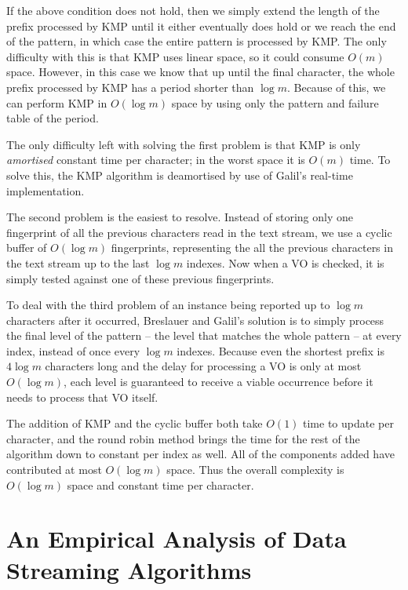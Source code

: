 \documentclass[ %
                    author={Dominic Joseph Moylett},
                    degree={MEng},
                     title={Dictionary Matching with Fingerprints},
                  subtitle={An Empirical Analysis},
                      type={research},
                      year={2015} ]{dissertation}
\begin{document}
If the above condition does not hold, then we simply extend the length of the prefix processed by KMP until it either eventually does hold or we reach the end of the pattern, in which case the entire pattern is processed by KMP. The only difficulty with this is that KMP uses linear space, so it could consume $O(m)$ space. However, in this case we know that up until the final character, the whole prefix processed by KMP has a period shorter than $\log m$. Because of this, we can perform KMP in $O(\log m)$ space by using only the pattern and failure table of the period.

The only difficulty left with solving the first problem is that KMP is only \textit{amortised} constant time per character; in the worst space it is $O(m)$ time. To solve this, the KMP algorithm is deamortised by use of Galil's \cite{Galil:1981:SMR:322234.322244} real-time implementation.

The second problem is the easiest to resolve. Instead of storing only one fingerprint of all the previous characters read in the text stream, we use a cyclic buffer of $O(\log m)$ fingerprints, representing the all the previous characters in the text stream up to the last $\log m$ indexes. Now when a VO is checked, it is simply tested against one of these previous fingerprints.

To deal with the third problem of an instance being reported up to $\log m$ characters after it occurred, Breslauer and Galil's solution is to simply process the final level of the pattern  --  the level that matches the whole pattern  --  at every index, instead of once every $\log m$ indexes. Because even the shortest prefix is $4\log m$ characters long and the delay for processing a VO is only at most $O(\log m)$, each level is guaranteed to receive a viable occurrence before it needs to process that VO itself.

The addition of KMP and the cyclic buffer both take $O(1)$ time to update per character, and the round robin method brings the time for the rest of the algorithm down to constant per index as well. All of the components added have contributed at most $O(\log m)$ space. Thus the overall complexity is $O(\log m)$ space and constant time per character.

\section{An Empirical Analysis of Data Streaming Algorithms}
\label{sec:summer}
\end{document}
